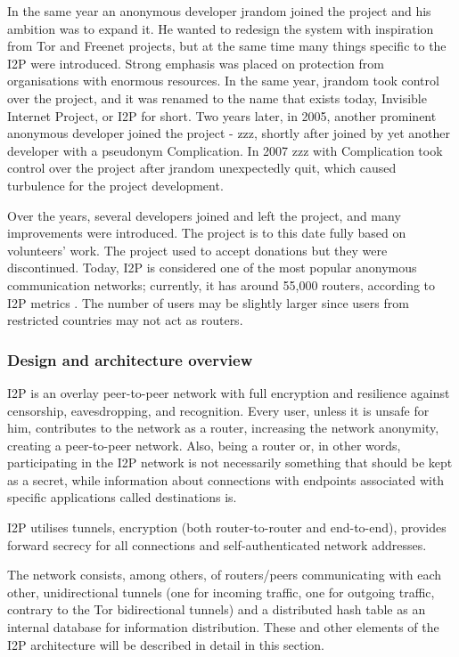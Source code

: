 In the same year an anonymous developer jrandom joined the project and his ambition was to expand it. He wanted to redesign the system with inspiration from Tor and Freenet projects, but at the same time many things specific to the I2P were introduced. Strong emphasis was placed on protection from organisations with enormous resources. In the same year, jrandom took control over the project, and it was renamed to the name that exists today, Invisible Internet Project, or I2P for short. Two years later, in 2005, another prominent anonymous developer joined the project - zzz, shortly after joined by yet another developer with a pseudonym Complication. In 2007 zzz with Complication took control over the project after jrandom unexpectedly quit, which caused turbulence for the project development.

Over the years, several developers joined and left the project, and many improvements were introduced. The project is to this date fully based on volunteers’ work. The project used to accept donations but they were discontinued. Today, I2P is considered one of the most popular anonymous communication networks; currently, it has around 55,000 routers, according to I2P metrics \cite{i2pmetrics, i2pmetrics2}. The number of users may be slightly larger since users from restricted countries may not act as routers.

\subsubsection{Design and architecture overview}
I2P is an overlay peer-to-peer network with full encryption and resilience against censorship, eavesdropping, and recognition. Every user, unless it is unsafe for him, contributes to the network as a router, increasing the network anonymity, creating a peer-to-peer network. Also, being a router or, in other words, participating in the I2P network is not necessarily something that should be kept as a secret, while information about connections with endpoints associated with specific applications called destinations is.

I2P utilises tunnels, encryption (both router-to-router and end-to-end), provides forward secrecy for all connections and self-authenticated network addresses.

The network consists, among others, of routers/peers communicating with each other, unidirectional tunnels (one for incoming traffic, one for outgoing traffic, contrary to the Tor bidirectional tunnels) and a distributed hash table as an internal database for information distribution. These and other elements of the I2P architecture will be described in detail in this section.

